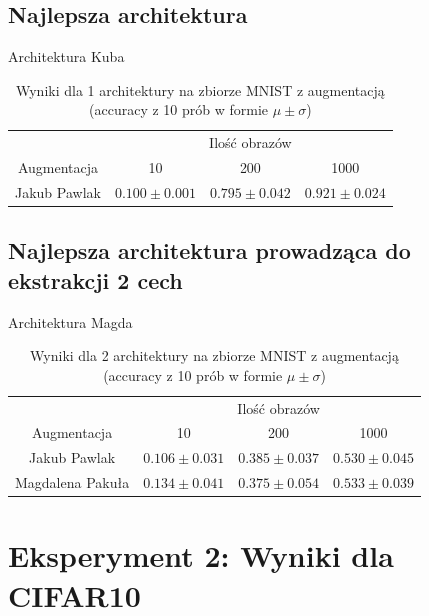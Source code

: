 \documentclass[10pt]{article}
\begin{document}
\subsection*{Najlepsza architektura}

Architektura Kuba

\begin{table}[H]\centering
    \begin{tabular}{cccc}
        \toprule
                     & \multicolumn{3}{c}{Ilość obrazów}                                          \\ \cmidrule{2-4}
        Augmentacja  & 10                                & 200                & 1000              \\ \midrule
        Jakub Pawlak & $0.100 \pm 0.001 $                & $0.795 \pm 0.042 $ & $0.921 \pm 0.024$ \\
        \bottomrule
    \end{tabular}
    \caption{Wyniki dla 1 architektury na zbiorze MNIST z augmentacją (accuracy z 10 prób w formie $\mu \pm \sigma$)}
\end{table}

\subsection*{Najlepsza architektura prowadząca do ekstrakcji 2 cech}

Architektura Magda

\begin{table}[H]\centering
    \begin{tabular}{cccc}
        \toprule
                         & \multicolumn{3}{c}{Ilość obrazów}                                          \\ \cmidrule{2-4}
        Augmentacja      & 10                                & 200                & 1000              \\ \midrule
        Jakub Pawlak     & $0.106 \pm 0.031 $                & $0.385 \pm 0.037 $ & $0.530 \pm 0.045$ \\
        Magdalena Pakuła & $0.134 \pm 0.041 $                & $0.375 \pm 0.054 $ & $0.533 \pm 0.039$ \\
        \bottomrule
    \end{tabular}
    \caption{Wyniki dla 2 architektury na zbiorze MNIST z augmentacją (accuracy z 10 prób w formie $\mu \pm \sigma$)}
\end{table}

\pagebreak
\section{Eksperyment 2: Wyniki dla CIFAR10}\label{sec:ex2_cifar}
\end{document}
